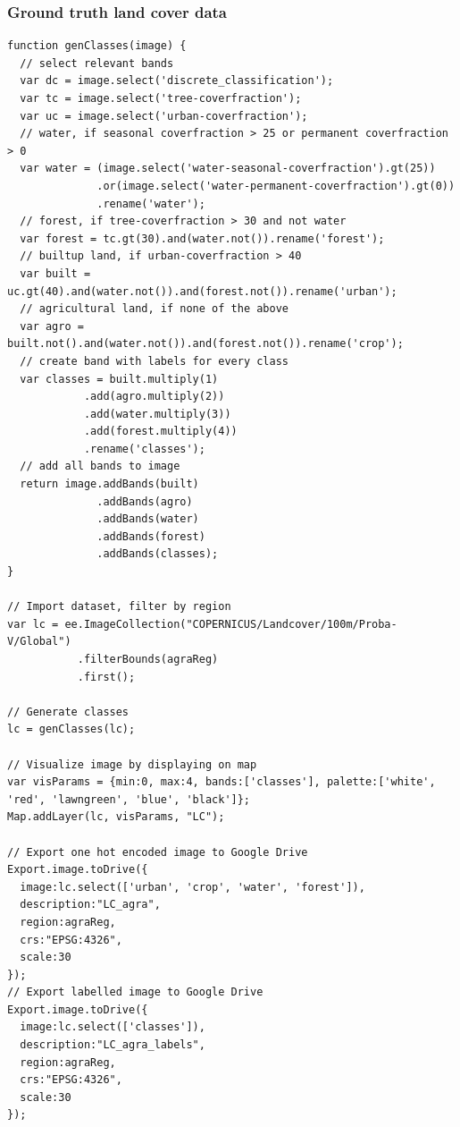 \documentclass[12pt, a4paper]{report}
\begin{document}
\subsubsection*{Ground truth land cover data}
\begin{verbatim}
function genClasses(image) {
  // select relevant bands
  var dc = image.select('discrete_classification');
  var tc = image.select('tree-coverfraction');
  var uc = image.select('urban-coverfraction');
  // water, if seasonal coverfraction > 25 or permanent coverfraction > 0
  var water = (image.select('water-seasonal-coverfraction').gt(25))
              .or(image.select('water-permanent-coverfraction').gt(0))
              .rename('water');
  // forest, if tree-coverfraction > 30 and not water
  var forest = tc.gt(30).and(water.not()).rename('forest');
  // builtup land, if urban-coverfraction > 40
  var built = uc.gt(40).and(water.not()).and(forest.not()).rename('urban');
  // agricultural land, if none of the above
  var agro = built.not().and(water.not()).and(forest.not()).rename('crop');
  // create band with labels for every class
  var classes = built.multiply(1)
			.add(agro.multiply(2))
			.add(water.multiply(3))
			.add(forest.multiply(4))
			.rename('classes');
  // add all bands to image
  return image.addBands(built)
              .addBands(agro)
              .addBands(water)
              .addBands(forest)
              .addBands(classes);
}

// Import dataset, filter by region
var lc = ee.ImageCollection("COPERNICUS/Landcover/100m/Proba-V/Global")
           .filterBounds(agraReg)
           .first();

// Generate classes
lc = genClasses(lc);

// Visualize image by displaying on map
var visParams = {min:0, max:4, bands:['classes'], palette:['white', 'red', 'lawngreen', 'blue', 'black']};
Map.addLayer(lc, visParams, "LC");

// Export one hot encoded image to Google Drive
Export.image.toDrive({
  image:lc.select(['urban', 'crop', 'water', 'forest']),
  description:"LC_agra",
  region:agraReg,
  crs:"EPSG:4326",
  scale:30
});
// Export labelled image to Google Drive
Export.image.toDrive({
  image:lc.select(['classes']),
  description:"LC_agra_labels",
  region:agraReg,
  crs:"EPSG:4326",
  scale:30
});
\end{verbatim}

\printbibliography[heading=bibintoc, title={References}]
\end{document}
